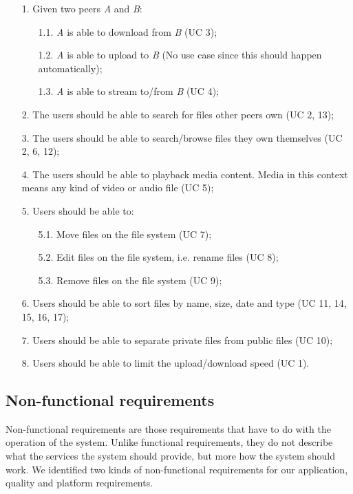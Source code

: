 \begin{itemize}
\item[1.] Given two peers \textit{A} and \textit{B}:
	\begin{itemize}
	\item[1.1.] \textit{A} is able to download from \textit{B} (UC 3);
	\item[1.2.] \textit{A} is able to upload to \textit{B} (No use case since this should happen automatically);
	\item[1.3.] \textit{A} is able to stream to/from \textit{B} (UC 4);
	\end{itemize}	
\item[2.] The users should be able to search for files other peers own (UC 2, 13);
\item[3.] The users should be able to search/browse files they own themselves (UC 2, 6, 12);
\item[4.] The users should be able to playback media content. Media in this context means any kind of video or audio file (UC 5);
\item[5.] Users should be able to:
	\begin{itemize}
	\item[5.1.] Move files on the file system (UC 7);
	\item[5.2.] Edit files on the file system, i.e. rename files (UC 8);	
	\item[5.3.] Remove files on the file system (UC 9);
	
	\end{itemize}	 
\item[6.] Users should be able to sort files by name, size, date and type (UC 11, 14, 15, 16, 17); 
\item[7.] Users should be able to separate private files from public files (UC 10);
\item[8.] Users should be able to limit the upload/download speed (UC 1). 
\end{itemize} 

\subsection{Non-functional requirements}
Non-functional requirements are those requirements that have to do with the operation of the system. Unlike functional requirements, they do not describe what the services the system should provide, but more how the system should work. We identified two kinds of non-functional requirements for our application, quality and platform requirements.

